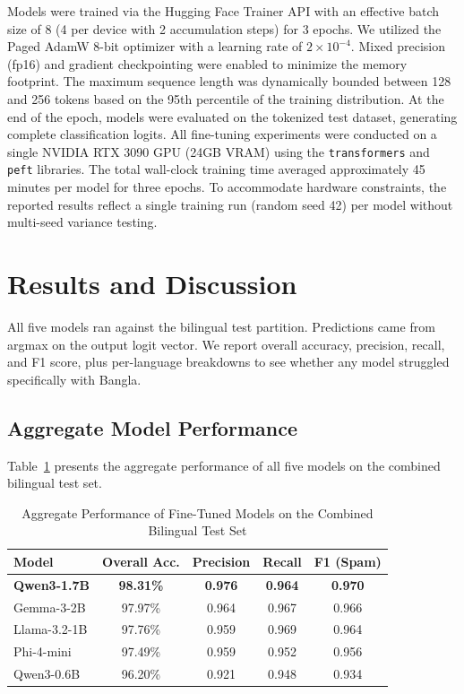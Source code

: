 \documentclass[journal]{IEEEtran}
\begin{document}
Models were trained via the Hugging Face Trainer API with an effective batch size of 8 (4 per device with 2 accumulation steps) for 3 epochs. We utilized the Paged AdamW 8-bit optimizer with a learning rate of $2 \times 10^{-4}$. Mixed precision (fp16) and gradient checkpointing were enabled to minimize the memory footprint. The maximum sequence length was dynamically bounded between 128 and 256 tokens based on the 95th percentile of the training distribution. At the end of the epoch, models were evaluated on the tokenized test dataset, generating complete classification logits. All fine-tuning experiments were conducted on a single NVIDIA RTX 3090 GPU (24GB VRAM) using the \texttt{transformers} and \texttt{peft} libraries. The total wall-clock training time averaged approximately 45 minutes per model for three epochs. To accommodate hardware constraints, the reported results reflect a single training run (random seed 42) per model without multi-seed variance testing.

\section{Results and Discussion}

All five models ran against the bilingual test partition. Predictions came from argmax on the output logit vector. We report overall accuracy, precision, recall, and F1 score, plus per-language breakdowns to see whether any model struggled specifically with Bangla.

\subsection{Aggregate Model Performance}

Table~\ref{tab:aggregate_results} presents the aggregate performance of all five models on the combined bilingual test set.

\begin{table}[htbp]
\caption{Aggregate Performance of Fine-Tuned Models on the Combined Bilingual Test Set}
\label{tab:aggregate_results}
\centering
\begin{tabular}{lcccc}
\toprule
\textbf{Model} & \textbf{Overall Acc.} & \textbf{Precision} & \textbf{Recall} & \textbf{F1 (Spam)} \\
\midrule
\textbf{Qwen3-1.7B} & \textbf{98.31\%} & \textbf{0.976} & \textbf{0.964} & \textbf{0.970} \\
Gemma-3-2B & 97.97\% & 0.964 & 0.967 & 0.966 \\
Llama-3.2-1B & 97.76\% & 0.959 & 0.969 & 0.964 \\
Phi-4-mini & 97.49\% & 0.959 & 0.952 & 0.956 \\
Qwen3-0.6B & 96.20\% & 0.921 & 0.948 & 0.934 \\
\bottomrule
\end{tabular}
\end{table}
\end{document}
